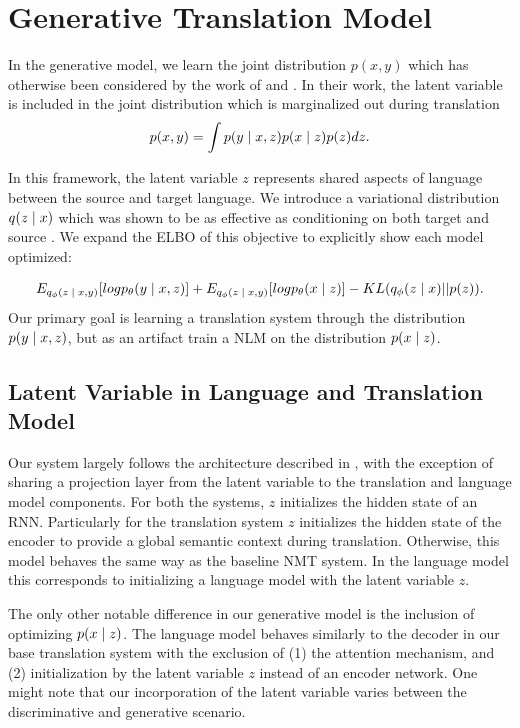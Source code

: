 \section{Generative Translation Model}

In the generative model, we learn the joint distribution $p(x, y)$ which has otherwise been considered by the work of \citet{eikema2018AEVNMT} and \citet{harshil2018GNMT}. In their work, the latent variable is included in the joint distribution which is marginalized out during translation
\begin{equation}
	p(x, y) = \int p(y \; | \;{x, z})  p(x\; | \;{z}) p(z) dz.
\end{equation}

In this framework, the latent variable $z$ represents shared aspects of language between the source and target language. We introduce a variational distribution $q( z\; | \;{x})$ which was shown to be as effective as conditioning on both target and source \cite{eikema2018AEVNMT}. We expand the \ac{ELBO} of this objective to explicitly show each model optimized:

\begin{equation}
E_{q_{\phi}(z \; | \;{x,y})} [ log p_{\theta}(y \; | \;{x, z})] +
E_{q_{\phi}(z \; | \;{x,y})} [ log p_{\theta}(x \; | \;{z})] -
	KL(q_{\phi}(z \; | \;{x}) || p(z)).
\end{equation}
Our primary goal is learning a translation system through the distribution $p(y \; | \;{x, z})$, but  as an artifact train a \ac{NLM} on the distribution $p(x \; | \;{z})$.

\subsection{Latent Variable in Language and Translation Model}


Our system largely follows the architecture described in \citet{eikema2018AEVNMT}, with the exception of sharing a projection layer from the latent variable to the translation and language model components. For both the systems, $z$ initializes the hidden state of an \ac{RNN}. Particularly for the translation system $z$  initializes the hidden state of the encoder to provide a global semantic context during translation. Otherwise, this model behaves the same way as the baseline \ac{NMT} system. In the language model this corresponds to initializing a language model with the latent variable $z$. 


The only other notable difference in our generative model is the inclusion of optimizing $p(x \; | \;{z})$. The language model behaves similarly to the decoder in our base translation system with the exclusion of (1) the attention mechanism, and (2) initialization by the latent variable $z$ instead of an encoder network. One might note that our incorporation of the latent variable varies between the discriminative and generative scenario. %

